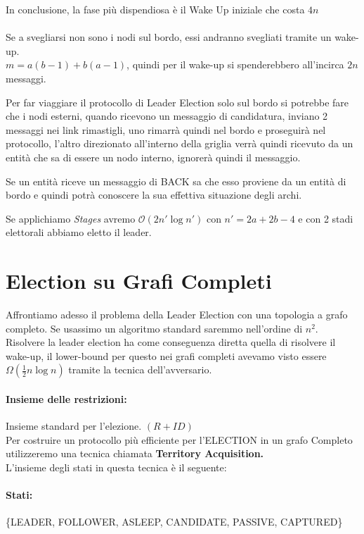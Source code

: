 In conclusione, la fase più dispendiosa è il Wake Up iniziale che costa $4n$\\\\
Se a svegliarsi non sono i nodi sul bordo, essi andranno svegliati tramite un
wake-up.\\
$m = a(b-1) + b(a-1)$, quindi per il wake-up si spenderebbero all'incirca $2n$
messaggi.

Per far viaggiare il protocollo di Leader Election solo sul bordo si potrebbe
fare che i nodi esterni, quando ricevono un messaggio di candidatura, inviano 2
messaggi nei link rimastigli, uno rimarrà quindi nel bordo e proseguirà nel
protocollo, l'altro direzionato all'interno della griglia verrà quindi ricevuto
da un entità che sa di essere un nodo interno, ignorerà quindi il messaggio.

Se un entità riceve un messaggio di BACK sa che esso proviene da un entità di
bordo e quindi potrà conoscere la sua effettiva situazione degli archi.

Se applichiamo \emph{Stages} avremo $\mathcal{O}(2n' \log n')$ con $n' = 2a + 2b
    - 4$ e con 2 stadi elettorali abbiamo eletto il leader.

\section{Election su Grafi Completi}
Affrontiamo adesso il problema della Leader Election con una topologia a grafo
completo. Se usassimo un algoritmo standard saremmo nell'ordine di $n^2$.
Risolvere la leader election ha come conseguenza diretta quella di risolvere il
wake-up, il lower-bound per questo nei grafi completi avevamo visto essere
$\Omega(\frac{1}{2}n \log n)$ tramite la tecnica dell'avversario.

\paragraph{Insieme delle restrizioni:} Insieme standard per l'elezione. $(R+ID)$\\
Per costruire un protocollo più efficiente per l'ELECTION in un grafo Completo
utilizzeremo una tecnica chiamata \textbf{Territory Acquisition.}\\
L'insieme degli stati in questa tecnica è il seguente:

\paragraph{Stati:} \{LEADER, FOLLOWER, ASLEEP, CANDIDATE, PASSIVE, CAPTURED\}


